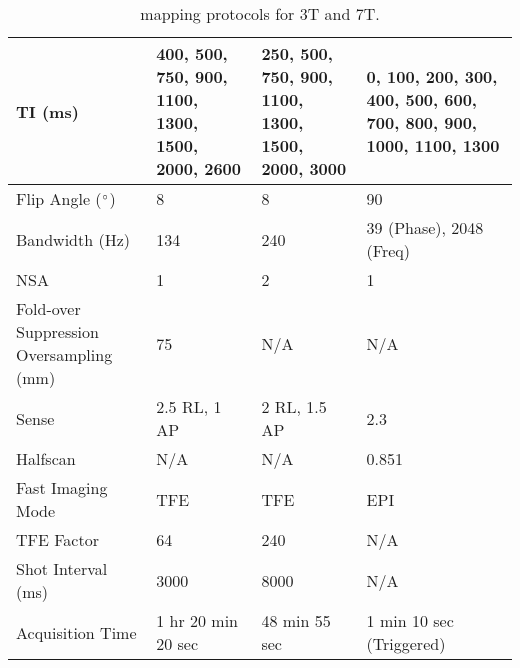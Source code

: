 \begin{table}[H]
\begin{tabularx}{1.0\textwidth}{X|X|X|X}
		TI (ms)                                   & 400, 500, 750, 900,   1100, 1300, 1500, 2000, 2600 & 250, 500, 750, 900,   1100, 1300, 1500, 2000, 3000 & 0, 100, 200, 300,   400, 500, 600, 700, 800, 900, 1000, 1100, 1300 \\ \hline
		Flip Angle ($\degree$)                    & 8                                                  & 8                                                  & 90                                                                 \\ \hline
		Bandwidth (Hz)                            & 134                                                & 240                                                & 39 (Phase), 2048 (Freq)                                                                \\ \hline
		NSA                                       & 1                                                  & 2                                                  & 1                                                                  \\ \hline
		Fold-over Suppression   Oversampling (mm) & 75                                                 & N/A                                                & N/A                                                                \\ \hline
		Sense                                     & 2.5 RL, 1 AP                                       & 2 RL, 1.5 AP                                        & 2.3                                                                \\ \hline
		Halfscan                                  & N/A                                                & N/A                                                & 0.851                                                              \\ \hline
		Fast Imaging Mode                         & TFE                                                & TFE                                                & EPI                                                                \\ \hline
		TFE Factor                                & 64                                                 & 240                                                & N/A                                                                \\ \hline
		Shot Interval (ms)                        & 3000                                               & 8000                                               & N/A                                                                \\ \hline
		Acquisition Time                          & 1 hr 20 min 20 sec                                 & 48 min 55 sec                                      & 1 min 10 sec (Triggered) 
	\end{tabularx}
	\caption{\tone mapping protocols for 3T and 7T.}
	\label{tab:ex_t1_mapping}
\end{table}

